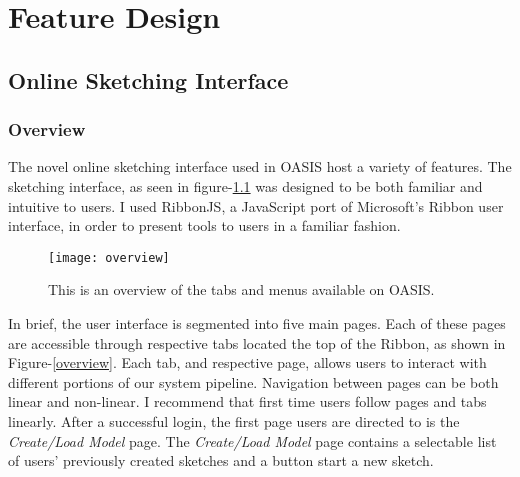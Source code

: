 \chapter{Feature Design} \label{sec:feature}

\section{Online Sketching Interface}

	\subsection{Overview}


		The novel online sketching interface used in OASIS host a variety of features.
		The sketching interface, as seen in figure-\ref{fig:overview} was designed to be both familiar and intuitive to users.
		I used RibbonJS, a JavaScript port of Microsoft's Ribbon user interface, in order to present tools to users in a familiar fashion\cite{todo}. 

		\begin{figure}[h]
		\centering
		\texttt{[image: overview]}
		\caption{This is an overview of the tabs and menus available on OASIS.}
		\label{fig:overview}
		\end{figure}

		In brief, the user interface is segmented into five main pages. 
		Each of these pages are accessible through respective tabs located the top of the Ribbon, as shown in Figure-\ref{overview}.
		Each tab, and respective page, allows users to interact with different portions of our system pipeline.
		Navigation between pages can be both linear and non-linear. 
		I recommend that first time users follow pages and tabs linearly. 
		After a successful login, the first page users are directed to is the \textit{Create/Load Model} page.
		The \textit{Create/Load Model} page contains a selectable list of users' previously created sketches and a button start a new sketch.\\

